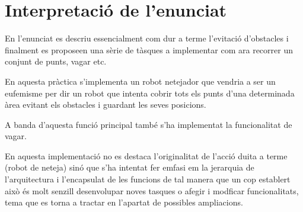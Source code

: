 \section{Interpretació de l'enunciat}

En l'enunciat es descriu essencialment com dur a terme l'evitació d'obstacles i finalment
es proposeen una sèrie de tàsques a implementar com ara recorrer un conjunt de punts, vagar etc.

En aquesta pràctica s'implementa un robot netejador que vendria a ser un eufemisme per dir un
robot que intenta cobrir tots els punts d'una determinada àrea evitant els obstacles
i guardant les seves posicions.

A banda d'aquesta funció principal també s'ha implementat la funcionalitat de vagar.

En aquesta implementació no es destaca l'originalitat de l'acció duita a terme (robot de neteja)
sinó que s'ha intentat fer emfasi em la jerarquia de l'arquitectura i l'encapsulat de les funcions de tal
manera que un cop establert això és molt senzill desenvolupar noves tasques o afegir i modficar
funcionalitats, tema que es torna a tractar en l'apartat de possibles ampliacions.